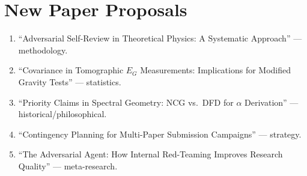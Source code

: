\documentclass[11pt,a4paper]{article}
\begin{document}
\section{New Paper Proposals}

\begin{enumerate}
\item ``Adversarial Self-Review in Theoretical Physics: A Systematic Approach'' --- methodology.
\item ``Covariance in Tomographic $E_G$ Measurements: Implications for Modified Gravity Tests'' --- statistics.
\item ``Priority Claims in Spectral Geometry: NCG vs.\ DFD for $\alpha$ Derivation'' --- historical/philosophical.
\item ``Contingency Planning for Multi-Paper Submission Campaigns'' --- strategy.
\item ``The Adversarial Agent: How Internal Red-Teaming Improves Research Quality'' --- meta-research.
\end{enumerate}
\end{document}
